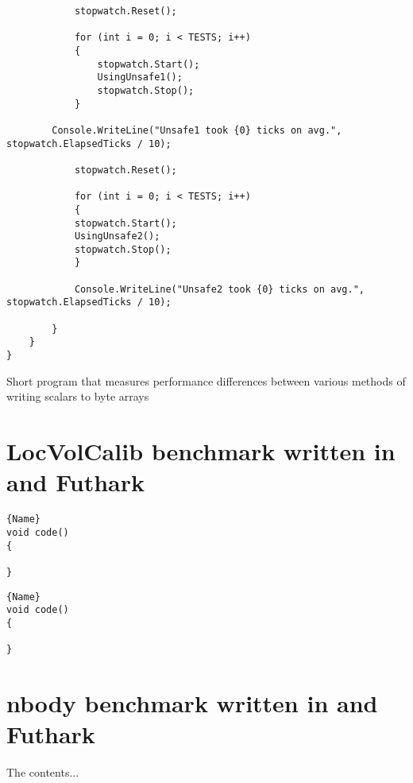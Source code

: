 \begin{appendices}
\begin{verbatim}
            stopwatch.Reset();

            for (int i = 0; i < TESTS; i++)
            {
                stopwatch.Start();
                UsingUnsafe1();
                stopwatch.Stop();
            }

        Console.WriteLine("Unsafe1 took {0} ticks on avg.", stopwatch.ElapsedTicks / 10);
            
            stopwatch.Reset();
            
            for (int i = 0; i < TESTS; i++)
            {
            stopwatch.Start();
            UsingUnsafe2();
            stopwatch.Stop();
            }
                
            Console.WriteLine("Unsafe2 took {0} ticks on avg.", stopwatch.ElapsedTicks / 10);

        }
    }
}
\end{verbatim}
{Short \csharp{} program that measures performance differences between
  various methods of writing scalars to byte arrays}
\label{fig:memoryperformancebenchmark}

\chapter{LocVolCalib benchmark written in \fshark{} and Futhark}
\noindent\begin{minipage}{.45\textwidth}
\begin{lstlisting}[caption=code 1,frame=tlrb]{Name}
void code()
{

}
\end{lstlisting}
\end{minipage}\hfill
\begin{minipage}{.45\textwidth}
\begin{lstlisting}[caption=code 2,frame=tlrb]{Name}
void code()
{

}
\end{lstlisting}
\end{minipage}


\chapter{nbody benchmark written in \fshark{} and Futhark}
The contents...
\end{appendices}


